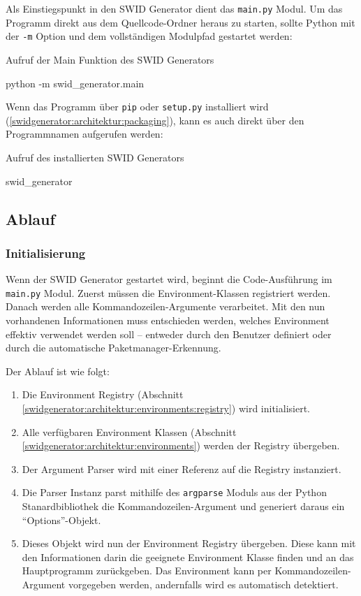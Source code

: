 Als Einstiegspunkt in den SWID Generator dient das \texttt{main.py} Modul. Um
das Programm direkt aus dem Quellcode-Ordner heraus zu starten, sollte Python
mit der \texttt{-m} Option und dem vollständigen Modulpfad gestartet werden:

\begin{listing}
\caption{Aufruf der Main Funktion des SWID Generators}
\begin{bashcode}
python -m swid_generator.main
\end{bashcode}
\end{listing}

Wenn das Programm über \texttt{pip} oder \texttt{setup.py} installiert wird (\autoref{swidgenerator:architektur:packaging}), kann es auch direkt
über den Programmnamen aufgerufen werden:

\begin{listing}
\caption{Aufruf des installierten SWID Generators}
\begin{bashcode}
swid_generator
\end{bashcode}
\end{listing}

\subsection{Ablauf}

\subsubsection{Initialisierung}
\label{swidgenerator:architektur:initialisierung}

Wenn der SWID Generator gestartet wird, beginnt die Code-Ausführung im
\texttt{main.py} Modul. Zuerst müssen die Environment-Klassen registriert werden. Danach werden alle
Kommandozeilen-Argumente verarbeitet. Mit den nun vorhandenen Informationen muss
entschieden werden, welches Environment effektiv verwendet werden soll --
entweder durch den Benutzer definiert oder durch die automatische
Paketmanager-Erkennung.

Der Ablauf ist wie folgt:

\begin{enumerate}
	\item Die Environment Registry
		(Abschnitt \ref{swidgenerator:architektur:environments:registry}) wird initialisiert.
	\item Alle verfügbaren Environment Klassen
		(Abschnitt \ref{swidgenerator:architektur:environments}) werden der Registry
		übergeben.
	\item Der Argument Parser wird mit einer Referenz auf die Registry instanziert.
	\item Die Parser Instanz parst mithilfe des \texttt{argparse} Moduls aus der
		Python Stanardbibliothek die Kommandozeilen-Argument und generiert daraus ein
		\enquote{Options}-Objekt. \item Dieses Objekt wird nun der Environment Registry
		übergeben. Diese kann mit den Informationen darin die geeignete Environment
		Klasse finden und an das Hauptprogramm zurückgeben. Das Environment kann per
		Kommandozeilen-Argument vorgegeben werden, andernfalls wird es automatisch
		detektiert.
\end{enumerate}

